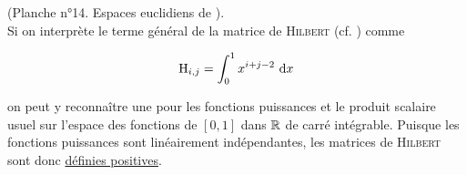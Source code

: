(Planche n°14. Espaces euclidiens de \cite{maths-france}). \\
Si on interprète le terme général de la matrice de \textsc{Hilbert} (cf. ) comme 
 
$$\mathrm{H}_{i,j} = \int_{0}^{1} x^{i+j-2}\ \mathrm{d} x$$

on peut y reconnaître une  pour les fonctions puissances et le produit scalaire usuel sur l'espace des fonctions de $[0, 1]$ dans $\mathbb{R}$ de carré intégrable. Puisque les fonctions puissances sont linéairement indépendantes, les matrices de \textsc{Hilbert} sont donc
\href{https://fr.wikipedia.org/wiki/Matrice_de_Hilbert}{définies positives}.
